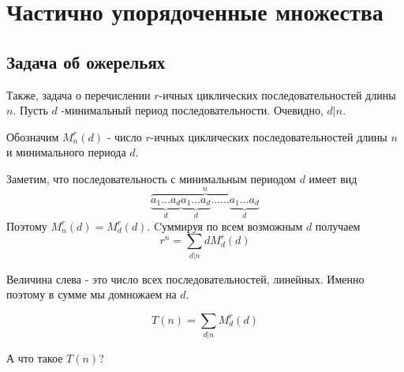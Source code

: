 \documentclass[unicode,10pt]{article}
\begin{document}
\section{Частично упорядоченные множества}
\subsection{Задача об ожерельях}
Также, задача о перечислении $r$-ичных циклических последовательностей длины $n$.
Пусть $d$ -минимальный период последовательности. Очевидно, $d|n$.
\begin{denote}
  Обозначим $M_n^r(d)$ - число $r$-ичных циклических последовательностей длины $n$ и минимального
  периода $d$.
\end{denote}
Заметим, что последовательность
с минимальным периодом $d$ имеет вид
\begin{displaymath}
  \overbrace{\underbrace{a_1\dots a_d}_{d}\underbrace{a_1\dots a_d}_{d}\dots\dots \underbrace{a_1\dots a_d}_{d}}^n
\end{displaymath}
Поэтому $M_n^r(d) = M_d^r(d)$. Cуммируя по всем возможным $d$ получаем
$$r^n=\sum\limits_{d|n}dM_d^r(d)$$
\begin{authornote}
  Величина слева - это число всех последовательностей, линейных. Именно поэтому в сумме мы домножаем на $d$.
\end{authornote}
\begin{displaymath}
  T(n) = \sum\limits_{d|n}M_d^r(d)
\end{displaymath}
\begin{authornote}
А что такое $T(n)$?
\end{authornote}
\end{document}
